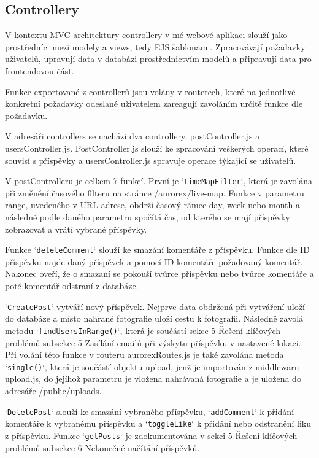 \subsection{Controllery}
\par V kontextu MVC architektury controllery v mé webové aplikaci slouží jako prostředníci mezi modely a views, tedy EJS šablonami. Zpracovávají požadavky uživatelů, upravují data v databázi prostřednictvím modelů a připravují data pro frontendovou část.
\par Funkce exportované z controllerů jsou volány v routerech, které na jednotlivé konkretní požadavky odeslané uživatelem zareagují zavoláním určité funkce dle požadavku.
\par V adresáři controllers se nacházi dva controllery, postController.js a usersController.js. PostController.js slouží ke zpracování veškerých operací, které souvisí s příspěvky a usersController.js spravuje operace týkající se uživatelů.

\par V postControlleru je celkem 7 funkcí. První je `\texttt{timeMapFilter}`, která je zavolána při změnění časového filteru na stránce /aurorex/live-map. Funkce v parametru range, uvedeného v URL adrese, obdrží časový rámec day, week nebo month a následně podle daného parametru spočítá čas, od kterého se mají příspěvky zobrazovat a vrátí vybrané příspěvky.
\par Funkce `\texttt{deleteComment}` slouží ke smazání komentáře z příspěvku. Funkce dle ID příspěvku najde daný příspěvek a pomocí ID komentáře požadovaný komentář. Nakonec oveří, že o smazaní se pokouší tvůrce příspěvku nebo tvůrce komentáře a poté komentář odstraní z databáze.
\par `\texttt{CreatePost}` vytváří nový příspěvek. Nejprve data obdržená při vytváření uloží do databáze a místo nahrané fotografie uloží cestu k fotografii. Následně zavolá metodu `\texttt{findUsersInRange()}`, která je součástí sekce 5 Řešení klíčových problémů subsekce 5 Zasílání emailů při výskytu příspěvku v nastavené lokaci. Při volání této funkce v routeru aurorexRoutes.js je také zavolána metoda `\texttt{single()}`, která je součástí objektu upload, jenž je importován z middlewaru upload.js, do jejíhož parametru je vložena nahrávaná fotografie a je uložena do adresáře /public/uploads.
\par `\texttt{DeletePost}` slouží ke smazání vybraného příspěvku, `\texttt{addComment}` k přidání komentáře k vybranému příspěvku a `\texttt{toggleLike}` k přidání nebo odstranění liku z příspěvku. Funkce `\texttt{getPosts}` je zdokumentována v sekci 5 Řešení klíčových problémů subsekce 6 Nekonečné načítání příspěvků.

